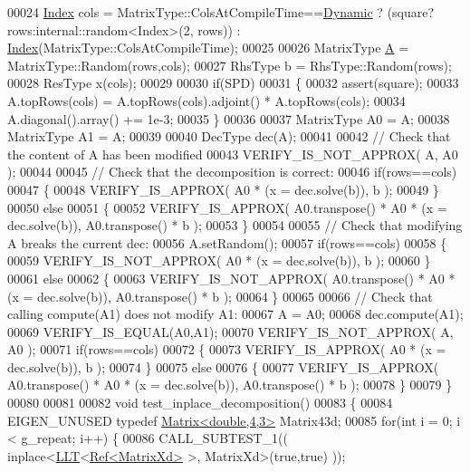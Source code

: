 \begin{DoxyCode}
00024   \hyperlink{namespace_eigen_a62e77e0933482dafde8fe197d9a2cfde}{Index} cols = MatrixType::ColsAtCompileTime==\hyperlink{namespace_eigen_ad81fa7195215a0ce30017dfac309f0b2}{Dynamic} ? (square?rows:internal::random<Index>(2,
      rows))    : \hyperlink{namespace_eigen_a62e77e0933482dafde8fe197d9a2cfde}{Index}(MatrixType::ColsAtCompileTime);
00025 
00026   MatrixType \hyperlink{group___core___module_class_eigen_1_1_matrix}{A} = MatrixType::Random(rows,cols);
00027   RhsType b = RhsType::Random(rows);
00028   ResType x(cols);
00029 
00030   \textcolor{keywordflow}{if}(SPD)
00031   \{
00032     assert(square);
00033     A.topRows(cols) = A.topRows(cols).adjoint() * A.topRows(cols);
00034     A.diagonal().array() += 1e-3;
00035   \}
00036 
00037   MatrixType A0 = A;
00038   MatrixType A1 = A;
00039 
00040   DecType dec(A);
00041 
00042   \textcolor{comment}{// Check that the content of A has been modified}
00043   VERIFY\_IS\_NOT\_APPROX( A, A0 );
00044 
00045   \textcolor{comment}{// Check that the decomposition is correct:}
00046   \textcolor{keywordflow}{if}(rows==cols)
00047   \{
00048     VERIFY\_IS\_APPROX( A0 * (x = dec.solve(b)), b );
00049   \}
00050   \textcolor{keywordflow}{else}
00051   \{
00052     VERIFY\_IS\_APPROX( A0.transpose() * A0 * (x = dec.solve(b)), A0.transpose() * b );
00053   \}
00054 
00055   \textcolor{comment}{// Check that modifying A breaks the current dec:}
00056   A.setRandom();
00057   \textcolor{keywordflow}{if}(rows==cols)
00058   \{
00059     VERIFY\_IS\_NOT\_APPROX( A0 * (x = dec.solve(b)), b );
00060   \}
00061   \textcolor{keywordflow}{else}
00062   \{
00063     VERIFY\_IS\_NOT\_APPROX( A0.transpose() * A0 * (x = dec.solve(b)), A0.transpose() * b );
00064   \}
00065 
00066   \textcolor{comment}{// Check that calling compute(A1) does not modify A1:}
00067   A = A0;
00068   dec.compute(A1);
00069   VERIFY\_IS\_EQUAL(A0,A1);
00070   VERIFY\_IS\_NOT\_APPROX( A, A0 );
00071   \textcolor{keywordflow}{if}(rows==cols)
00072   \{
00073     VERIFY\_IS\_APPROX( A0 * (x = dec.solve(b)), b );
00074   \}
00075   \textcolor{keywordflow}{else}
00076   \{
00077     VERIFY\_IS\_APPROX( A0.transpose() * A0 * (x = dec.solve(b)), A0.transpose() * b );
00078   \}
00079 \}
00080 
00081 
00082 \textcolor{keywordtype}{void} test\_inplace\_decomposition()
00083 \{
00084   EIGEN\_UNUSED \textcolor{keyword}{typedef} \hyperlink{group___core___module_class_eigen_1_1_matrix}{Matrix<double,4,3>} Matrix43d;
00085   \textcolor{keywordflow}{for}(\textcolor{keywordtype}{int} i = 0; i < g\_repeat; i++) \{
00086     CALL\_SUBTEST\_1(( inplace<\hyperlink{group___cholesky___module_class_eigen_1_1_l_l_t}{LLT}<\hyperlink{group___core___module_class_eigen_1_1_ref}{Ref<MatrixXd>} >, MatrixXd>(\textcolor{keyword}{true},\textcolor{keyword}{true}) ));

\end{DoxyCode}
